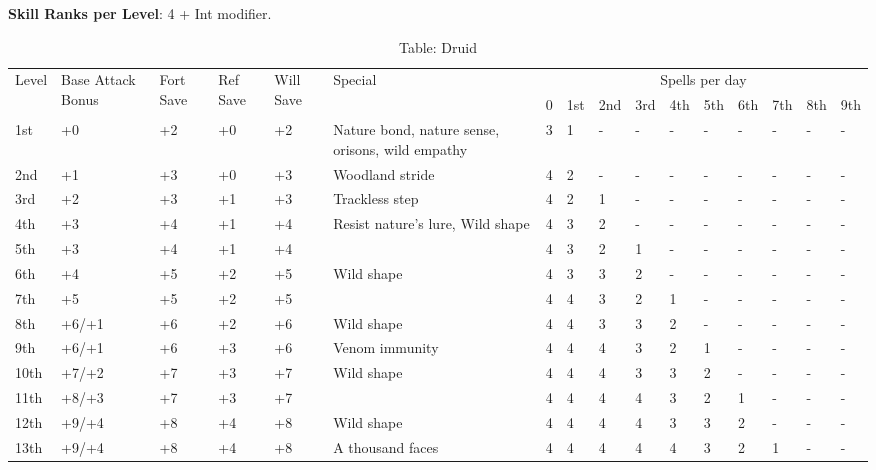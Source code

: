 \textbf{Skill Ranks per Level}: 4 + Int modifier.
\begin{table}[]
\caption{Table: Druid}
\sffamily
\setlength{\tabcolsep}{1pt}
\begin{tabularx}{\linewidth}{lp{6em}p{2.5em}p{2.5em}p{2.5em}Xllllllllll}
\multirow{2}{*}{Level} & \multirow{2}{*}{\parbox{5em}{Base Attack Bonus}} & \multirow{2}{*}{\parbox{1.5em}{Fort Save}} & \multirow{2}{*}{\parbox{1.5em}{Ref Save}} & \multirow{2}{*}{\parbox{1.5em}{Will Save}} & Special                                                                                              & \multicolumn{10}{c}{Spells per day} \\
                       &                                    &                            &                           &                            &                                                                                                  &  0 & 1st & 2nd & 3rd & 4th & 5th & 6th & 7th & 8th & 9th \\
\hline
1st & +0 & +2 & +0 & +2 & Nature bond, nature sense, orisons, wild empathy & 3 & 1 & - & - & - & - & - & - & - & -\\
2nd & +1 & +3 & +0 & +3 & Woodland stride & 4 & 2 & - & - & - & - & - & - & - & -\\
3rd & +2 & +3 & +1 & +3 & Trackless step & 4 & 2 & 1 & - & - & - & - & - & - & -\\
4th & +3 & +4 & +1 & +4 & Resist nature's lure, Wild shape & 4 & 3 & 2 & - & - & - & - & - & - & -\\
5th & +3 & +4 & +1 & +4 &  & 4 & 3 & 2 & 1 & - & - & - & - & - & -\\
6th & +4 & +5 & +2 & +5 & Wild shape & 4 & 3 & 3 & 2 & - & - & - & - & - & -\\
7th & +5 & +5 & +2 & +5 &  & 4 & 4 & 3 & 2 & 1 & - & - & - & - & -\\
8th & +6/+1 & +6 & +2 & +6 & Wild shape & 4 & 4 & 3 & 3 & 2 & - & - & - & - & -\\
9th & +6/+1 & +6 & +3 & +6 & Venom immunity & 4 & 4 & 4 & 3 & 2 & 1 & - & - & - & -\\
10th & +7/+2 & +7 & +3 & +7 & Wild shape & 4 & 4 & 4 & 3 & 3 & 2 & - & - & - & -\\
11th & +8/+3 & +7 & +3 & +7 &  & 4 & 4 & 4 & 4 & 3 & 2 & 1 & - & - & -\\
12th & +9/+4 & +8 & +4 & +8 & Wild shape & 4 & 4 & 4 & 4 & 3 & 3 & 2 & - & - & -\\
13th & +9/+4 & +8 & +4 & +8 & A thousand faces & 4 & 4 & 4 & 4 & 4 & 3 & 2 & 1 & - & -\\

\end{tabularx}
\end{table}
